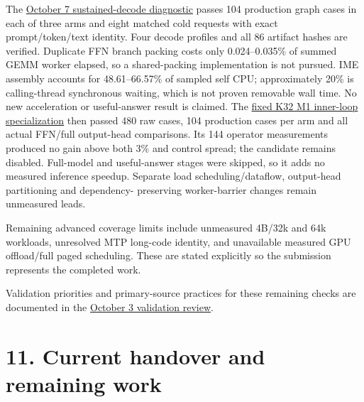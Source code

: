 \documentclass[10pt,a4paper]{article}
\begin{document}
The
\href{https://github.com/MoyaMryia/riscv-accl/blob/main/spacemit/reports/2026-10-07-decode-packing-results.md}{October
7 sustained-decode diagnostic} passes 104 production graph cases in each
of three arms and eight matched cold requests with exact
prompt/token/text identity. Four decode profiles and all 86 artifact
hashes are verified. Duplicate FFN branch packing costs only
0.024--0.035\% of summed GEMM worker elapsed, so a shared-packing
implementation is not pursued. IME assembly accounts for 48.61--66.57\%
of sampled self CPU; approximately 20\% is calling-thread synchronous
waiting, which is not proven removable wall time. No new acceleration or
useful-answer result is claimed. The
\href{https://github.com/MoyaMryia/riscv-accl/blob/main/spacemit/reports/2026-10-07-ime-m1-k32-results.md}{fixed
K32 M1 inner-loop specialization} then passed 480 raw cases, 104
production cases per arm and all actual FFN/full output-head
comparisons. Its 144 operator measurements produced no gain above both
3\% and control spread; the candidate remains disabled. Full-model and
useful-answer stages were skipped, so it adds no measured inference
speedup. Separate load scheduling/dataflow, output-head partitioning and
dependency- preserving worker-barrier changes remain unmeasured leads.

Remaining advanced coverage limits include unmeasured 4B/32k and 64k
workloads, unresolved MTP long-code identity, and unavailable measured
GPU offload/full paged scheduling. These are stated explicitly so the
submission represents the completed work.

Validation priorities and primary-source practices for these remaining
checks are documented in the
\href{https://github.com/MoyaMryia/riscv-accl/blob/main/spacemit/reports/2026-10-03-validation-practice.md}{October
3 validation review}.

\Needspace{250pt}

\hypertarget{current-handover-and-remaining-work}{%
\section{11. Current handover and remaining
work}\label{current-handover-and-remaining-work}}
\end{document}
